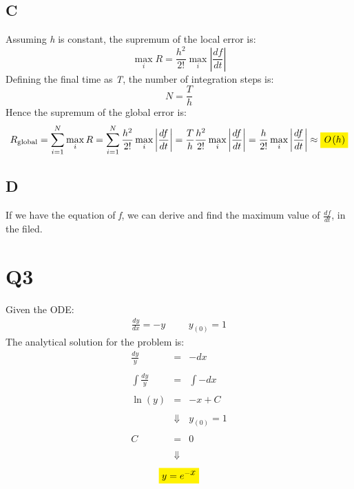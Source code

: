 \documentclass[11pt, a4paper]{article}
\begin{document}
\subsection{C}
Assuming \emph{h} is constant, the supremum of the local error is:
\begin{equation*}
    \max_i{R}=\frac{h^2}{2!}\max_i{\left|\frac{df}{dt}\right|}
\end{equation*}
Defining the final time as \emph{T}, the number of integration steps is:
\begin{equation}
    N=\frac{T}{h}
\end{equation}
Hence the supremum of the global error is:
\begin{equation}
    R_\text{global}=\sum_{i=1}^{N}\max_i{R}=\sum_{i=1}^{N}\frac{h^2}{2!}\max_i{\left|\frac{df}{dt}\right|}=\frac{T}{h}\frac{h^2}{2!}\max_i{\left|\frac{df}{dt}\right|}=\frac{h}{2!}\max_i{\left|\frac{df}{dt}\right|}\approx\colorbox{yellow}{$\emph{O}\left(h\right)$}
\end{equation}

\subsection{D}
If we have the equation of \emph{f}, we can derive and find the maximum value of $\displaystyle\frac{df}{dt}$, in the filed.

\newpage
\section{Q3}
Given the ODE:
\begin{equation}
    \begin{matrix}
        \displaystyle\frac{dy}{dx}=-y &&& y_{\left(0\right)}=1
    \end{matrix}
\end{equation}
The analytical solution for the problem is:
\begin{equation}
    \begin{array}{rcl}
        \displaystyle\frac{dy}{y} & = & -dx \\\\
        \displaystyle\int\frac{dy}{y} & = & \int-dx \\\\
        \displaystyle\ln\left(y\right) & = & -x+C \\\\
        & \Downarrow & y_{\left(0\right)}=1 \\\\
        C & = & 0 \\\\
        & \Downarrow &
    \end{array}
\end{equation}
\begin{equation}
    \colorbox{yellow}{$y=\displaystyle e^{-\displaystyle x}$}
\end{equation}
\end{document}
